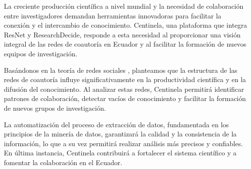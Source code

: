 La creciente producción científica a nivel mundial y la necesidad de colaboración entre investigadores demandan herramientas innovadoras para facilitar la conexión y el intercambio de conocimiento. Centinela, una plataforma que integra ResNet y ResearchDecide, responde a esta necesidad al proporcionar una visión integral de las redes de coautoría en Ecuador y al facilitar la formación de nuevos equipos de investigación.

Basándonos en la teoría de redes sociales \cite{REDES-SOCIALES-TEORIA}, planteamos que la estructura de las redes de coautoría influye significativamente en la productividad científica y en la difusión del conocimiento. Al analizar estas redes, Centinela permitirá identificar patrones de colaboración, detectar vacíos de conocimiento y facilitar la formación de nuevos grupos de investigación.

La automatización del proceso de extracción de datos, fundamentada en los principios de la minería de datos, garantizará la calidad y la consistencia de la información, lo que a su vez permitirá realizar análisis más precisos y confiables. En última instancia, Centinela contribuirá a fortalecer el sistema científico y a fomentar la colaboración en el Ecuador.
